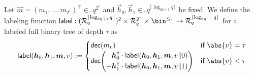 \begin{definition}\label{def:label}
  Let $\vec{m}=(m_{1},\dots,m_{{2^{\tau}}})^\intercal\in\ring_q^{2^{\tau}}$ and $\vec{h}_0,\vec{h}_1 \in \ring_q^{\lceil\log_{2\eta+1} q\rceil}$ be fixed.
  We define the labeling function $\lbl : (\ring_q^{\lceil\log_{2\eta+1} q\rceil})^2 \times \ring_q^{2^{\tau}}\times \bin^{\leq \tau} \to \ring_q^{\lceil \log_{2\eta+1} q \rceil}$ for a labeled full binary tree of depth $\tau$ as
  \[
    \lbl(\vec{h}_0,\vec{h}_1,\vec{m},v) := \begin{cases} \decomp(m_{v}) & \text{if } \abs{v}=\tau\\ \decomp\mleft(\begin{aligned}\vec{h}_0^\intercal \cdot\lbl(\vec{h}_0,\vec{h}_1,\vec{m},v\Vert 0)\\ + \vec{h}_1^\intercal \cdot\lbl(\vec{h}_0,\vec{h}_1,\vec{m},v\Vert 1)\end{aligned}\mright)& \text{if } \abs{v}< \tau\end{cases}
  \]
\end{definition}

